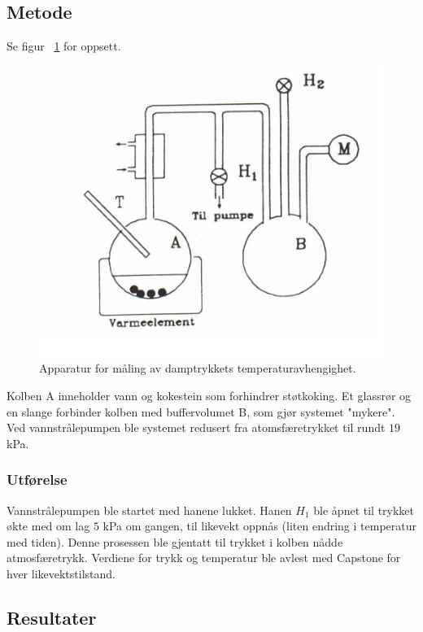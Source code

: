 \documentclass[aps,reprint]{revtex4-1}
\begin{document}
\subsection{Metode}
Se figur ~\ref{fig:apparatur} for oppsett.
\begin{figure}[H]
  \includegraphics[width = \linewidth]{apparatur.png}
  \caption{Apparatur for måling av damptrykkets temperaturavhengighet.}
  \label{fig:apparatur}
\end{figure}
Kolben A inneholder vann og kokestein som forhindrer støtkoking. Et glassrør
og en slange forbinder kolben med buffervolumet B, som gjør systemet "mykere".
Ved vannstrålepumpen ble systemet redusert fra atomsfæretrykket til rundt
$19$ kPa.
\subsubsection{Utførelse}
Vannstrålepumpen ble startet med hanene lukket. Hanen $H_1$ ble åpnet til trykket
økte med om lag $5$ kPa om gangen, til likevekt oppnås (liten endring i
temperatur med tiden). Denne prosessen ble gjentatt til trykket i kolben
nådde atmosfæretrykk. Verdiene for trykk og temperatur ble avlest med Capstone
for hver likevektstilstand.
\subsection{Resultater}
\end{document}
